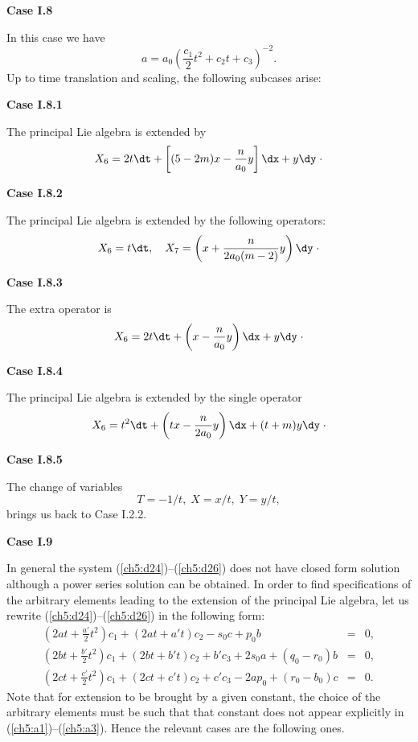{\bf Case I.8 }

In this case we have
\[a=a_0\left ( \frac{c_1}{2}t^2+c_2t+c_3\right )^{-2}.\]
Up to time translation and scaling, the following subcases arise:

{\bf Case I.8.1  }

The principal Lie algebra is extended by
\[X_6=2t\dt +\left [ (5-2m)x-\frac{n}{a_0}y \right ]\dx +y\dy \;\cdot \]

{\bf Case I.8.2  }

The principal Lie algebra is extended by the following operators:
\[
X_6 = t\dt ,\quad
X_7 = \left (x+\frac{n}{2a_0(m-2)}y \right )\dy \;\cdot
\]

{\bf Case I.8.3   }

The extra operator is
\[X_6=2t\dt +\left ( x-\frac{n}{a_0}y \right ) \dx +y\dy \;\cdot\]

{\bf Case I.8.4 }

The principal Lie algebra is extended by the single operator
\[X_6=t^2\dt +\left ( tx-\frac{n}{2a_0}y \right )\dx+(t+m)y\dy\;\cdot \]

{\bf Case I.8.5 }

The change of variables
\[T=-1/t,\;X=x/t,\;Y=y/t,\]
brings us back to Case I.2.2. 

{\bf Case I.9 }

In general the system (\ref{ch5:d24})--(\ref{ch5:d26}) does not have closed form
solution although a power series solution can be obtained. In order to find
specifications of the arbitrary elements leading to the extension of
the principal Lie algebra, let us rewrite (\ref{ch5:d24})--(\ref{ch5:d26}) in the
following form:
\begin{eqnarray}
\left ( 2at+\frac{a'}{2}t^2 \right )c_1+(2at+a't)c_2-s_0c+p_0b &=&0,
\label{ch5:a1}\\
\left ( 2bt+\frac{b'}{2}t^2 \right )c_1+(2bt+b't)c_2 +b'c_3+2s_0a
+(q_0-r_0)b &=&0, \label{ch5:a2}\\
\left ( 2ct+\frac{c'}{2}t^2 \right )c_1+(2ct+c't)c_2
+c'c_3-2ap_0 +(r_0-b_0)c &=&0 . \label{ch5:a3}
\end{eqnarray}
Note that for extension to be brought by a given constant, the choice  of the
arbitrary elements must be such that that constant does not appear
explicitly in (\ref{ch5:a1})--(\ref{ch5:a3}).
Hence the relevant cases are the following ones.
 
